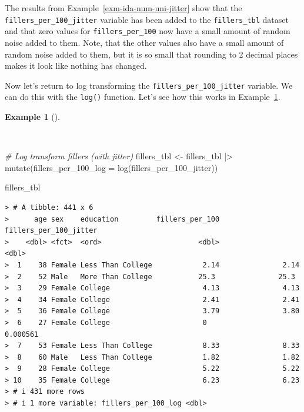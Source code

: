 \documentclass[
  letterpaper,
]{latex/krantz}
\newenvironment{Shaded}{\begin{snugshade}}{\end{snugshade}}
\newcommand{\AttributeTok}[1]{\textcolor[rgb]{0.00,0.00,0.00}{#1}}
\newcommand{\CommentTok}[1]{\textcolor[rgb]{0.00,0.00,0.00}{\textit{#1}}}
\newcommand{\FunctionTok}[1]{\textcolor[rgb]{0.00,0.00,0.00}{#1}}
\newcommand{\NormalTok}[1]{\textcolor[rgb]{0.00,0.00,0.00}{#1}}
\newcommand{\OtherTok}[1]{\textcolor[rgb]{0.00,0.00,0.00}{#1}}
\newcommand{\SpecialCharTok}[1]{\textcolor[rgb]{0.00,0.00,0.00}{#1}}
\theoremstyle{definition}
\newtheorem{example}{Example}[chapter]
\theoremstyle{remark}
\begin{document}
The results from Example~\ref{exm-ida-num-uni-jitter} show that the
\texttt{fillers\_per\_100\_jitter} variable has been added to the
\texttt{fillers\_tbl} dataset and that zero values for
\texttt{fillers\_per\_100} now have a small amount of random noise added
to them. Note, that the other values also have a small amount of random
noise added to them, but it is so small that rounding to 2 decimal
places makes it look like nothing has changed.

Now let's return to log transforming the
\texttt{fillers\_per\_100\_jitter} variable. We can do this with the
\texttt{log()} function. Let's see how this works in
Example~\ref{exm-ida-num-uni-log}.

\begin{example}[]\protect\hypertarget{exm-ida-num-uni-log}{}\label{exm-ida-num-uni-log}

~

\begin{Shaded}
\begin{Highlighting}[]
\CommentTok{\# Log transform fillers (with jitter)}
\NormalTok{fillers\_tbl }\OtherTok{\textless{}{-}}
\NormalTok{  fillers\_tbl }\SpecialCharTok{|\textgreater{}}
  \FunctionTok{mutate}\NormalTok{(}\AttributeTok{fillers\_per\_100\_log =} \FunctionTok{log}\NormalTok{(fillers\_per\_100\_jitter))}

\NormalTok{fillers\_tbl}
\end{Highlighting}
\end{Shaded}

\begin{verbatim}
> # A tibble: 441 x 6
>      age sex    education         fillers_per_100 fillers_per_100_jitter
>    <dbl> <fct>  <ord>                       <dbl>                  <dbl>
>  1    38 Female Less Than College            2.14               2.14    
>  2    52 Male   More Than College           25.3               25.3     
>  3    29 Female College                      4.13               4.13    
>  4    34 Female College                      2.41               2.41    
>  5    36 Female College                      3.79               3.80    
>  6    27 Female College                      0                  0.000561
>  7    53 Female Less Than College            8.33               8.33    
>  8    60 Male   Less Than College            1.82               1.82    
>  9    28 Female College                      5.22               5.22    
> 10    35 Female College                      6.23               6.23    
> # i 431 more rows
> # i 1 more variable: fillers_per_100_log <dbl>
\end{verbatim}

\end{example}
\end{document}

